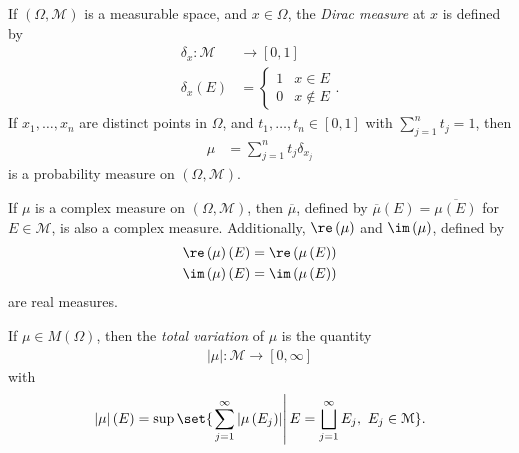 \begin{definition}
  If $\left(\Omega,\mathcal{M}\right)$ is a measurable space, and $x\in \Omega$, the \textit{Dirac measure} at $x$ is defined by
  \begin{align*}
    \delta_{x}\colon \mathcal{M}&\rightarrow [0,1]\\
    \delta_x\left(E\right) &= \begin{cases}
      1 & x\in E\\
      0 & x\notin E
    \end{cases}.
  \end{align*}
    If $x_1,\dots,x_n$ are distinct points in $\Omega$, and $t_1,\dots,t_n\in [0,1]$ with $\sum_{j=1}^{n}t_j = 1$, then
    \begin{align*}
      \mu &= \sum_{j=1}^{n}t_j\delta_{x_j}
    \end{align*}
    is a probability measure on $\left(\Omega,\mathcal{M}\right)$.
\end{definition}
\begin{fact}
  If $\mu$ is a complex measure on $\left(\Omega,\mathcal{M}\right)$, then $\overline{\mu}$, defined by $\overline{\mu}\left(E\right) = \overline{\mu\left(E\right)}$ for $E\in \mathcal{M}$, is also a complex measure. Additionally, $\re\left(\mu\right)$ and $\im\left(\mu\right)$, defined by
  \begin{align*}
    \re\left(\mu\right)\left(E\right) &= \re\left(\mu\left(E\right)\right)\\
    \im\left(\mu\right)\left(E\right) &= \im\left(\mu\left(E\right)\right)
  \end{align*}
  are real measures.
\end{fact}
\begin{definition}
  If $\mu\in M\left(\Omega\right)$, then the \textit{total variation} of $\mu$ is the quantity
  \begin{align*}
    \left\vert \mu \right\vert\colon \mathcal{M}\rightarrow [0,\infty]
    \end{align*}
    with
    \begin{align*}
    \left\vert \mu \right\vert\left(E\right) = \sup\set{\left.\sum_{j=1}^{\infty}\left\vert \mu\left(E_j\right) \right\vert\right|E = \bigsqcup_{j=1}^{\infty}E_j,~E_j\in\mathcal{M}}.
  \end{align*}
\end{definition}
